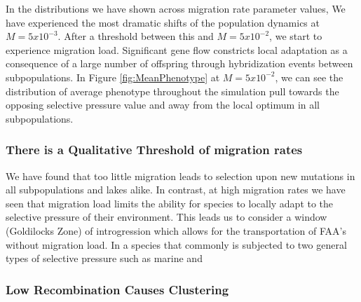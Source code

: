 \documentclass{article}
\begin{document}

In the distributions we have shown across migration rate parameter values, 
We have experienced the most dramatic shifts of the population dynamics at $M = 5x10^{-3}$.
After a threshold between this and $M = 5x10^{-2}$, we start to experience migration load. 
Significant gene flow constricts local adaptation
as a consequence of a large number of offspring through hybridization events between subpopulations.
In Figure \ref{fig:MeanPhenotype} at $M = 5x10^{-2}$, we can see the distribution of average phenotype throughout the simulation
pull towards the opposing selective pressure value and away from the local optimum in all subpopulations.



	
\subsubsection*{There is a Qualitative Threshold of migration rates}


We have found that too little migration leads to selection upon new mutations in all subpopulations and lakes alike. 
In contrast, at high migration rates we have seen that migration load limits 
the ability for species to locally adapt to the selective pressure of their environment.
This leads us to consider a window (Goldilocks Zone) of introgression which allows for the transportation
of FAA's without migration load. In a species that commonly is subjected to two general types of selective pressure 
such as marine and 

\subsubsection*{Low Recombination Causes Clustering}
\end{document}
